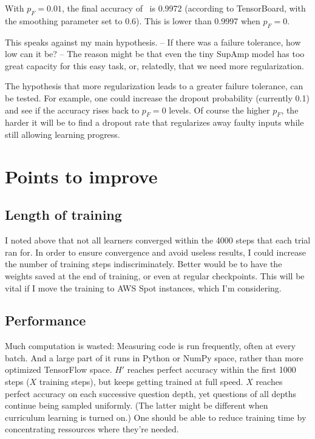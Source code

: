 \documentclass{farlamp}
\begin{document}
\Obs With $p_F = 0.01$, the final accuracy of \Xpa\ is 0.9972 (according to
TensorBoard, with the smoothing parameter set to 0.6). This is lower than 0.9997
when $p_F = 0$.

\Disc This speaks against my main hypothesis. – If there was a failure
tolerance, how low can it be? – The reason might be that even the tiny SupAmp
model has too great capacity for this easy task, or, relatedly, that we need
more regularization.

The hypothesis that more regularization leads to a greater failure tolerance,
can be tested. \TODO For example, one could increase the dropout probability
(currently 0.1) and see if the accuracy rises back to $p_F = 0$ levels. Of
course the higher $p_F$, the harder it will be to find a dropout rate that
regularizes away faulty inputs while still allowing learning progress.


\section{Points to improve}

\subsection{Length of training}

I noted above that not all learners converged within the 4000 steps that each
trial ran for. In order to ensure convergence and avoid useless results, I could
increase the number of training steps indiscriminately. Better would be to have
the weights saved at the end of training, or even at regular checkpoints. This
will be vital if I move the training to AWS Spot instances, which I'm
considering.


\subsection{Performance}

Much computation is wasted: Measuring code is run frequently, often at every
batch. And a large part of it runs in Python or NumPy space, rather than more
optimized TensorFlow space. $H'$ reaches perfect accuracy within the first 1000
steps ($X$ training steps), but keeps getting trained at full speed. $X$ reaches
perfect accuracy on each successive question depth, yet questions of all depths
continue being sampled uniformly. (The latter might be different when curriculum
learning is turned on.) One should be able to reduce training time by
concentrating ressources where they're needed.
\end{document}
